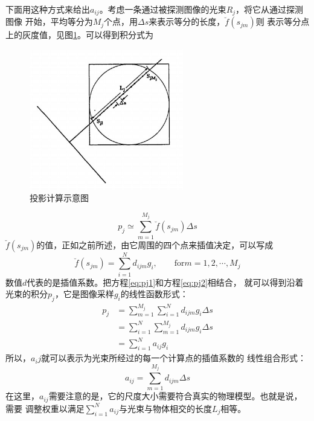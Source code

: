 下面用这种方式来给出$a_{ij}$。考虑一条通过被探测图像的光束$R_j$，将它从通过探测图像
开始，平均等分为$M_j$个点，用$\Delta s$来表示等分的长度，$\breve{f}(s_{jm})$则
表示等分点上的灰度值，见图\ref{fig:sart1}。可以得到积分式为
\begin{figure}[!h]
\center
\includegraphics[width=0.6\textwidth]{figure/ART/sart1}
\caption{投影计算示意图}\label{fig:sart1}
\end{figure}
\begin{equation}\label{eq:pj1}
p_j\simeq\sum^{M_j}_{m=1}\breve{f}(s_{jm})\Delta s
\end{equation}
$\breve{f}(s_{jm})$的值，正如之前所述，由它周围的四个点来插值决定，可以写成
\begin{equation}\label{eq:pj2}
\breve{f}(s_{jm})=\sum^N_{i=1}d_{ijm}g_i,\qquad \text{for}m=1,2,\cdots,M_j
\end{equation}
数值$d$代表的是插值系数。把方程\eqref{eq:pj1}和方程\eqref{eq:pj2}相结合，
就可以得到沿着光束的积分$p_j$，它是图像采样$g_i$的线性函数形式：
\begin{equation}
\begin{split}
p_j&=\sum^{M_j}_{m=1}\sum^N_{i=1}d_{ijm}g_i\Delta s \\
&=\sum^N_{i=1}\sum^{M_j}_{m=1}d_{ijm}g_i\Delta s \\
&=\sum^N_{i=1}a_{ij}g_i
\end{split}
\end{equation}
所以，$a_ij$就可以表示为光束所经过的每一个计算点的插值系数的
线性组合形式：
\begin{equation}\label{eq:computea}
a_{ij}=\sum^{M_j}_{m=1}d_{ijm}\Delta s
\end{equation}
在这里，$a_{ij}$需要注意的是，它的尺度大小需要符合真实的物理模型。也就是说，需要
调整权重以满足$\sum^N_{i=1}a_{ij}$与光束与物体相交的长度$L_j$相等。

